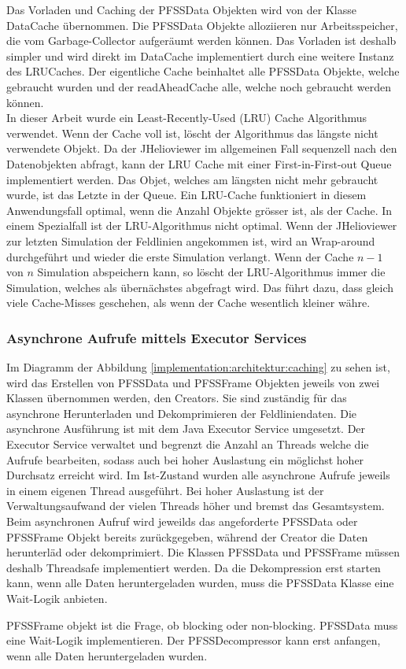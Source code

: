 Das Vorladen und Caching der PFSSData Objekten wird von der Klasse DataCache übernommen. Die PFSSData Objekte alloziieren nur Arbeitsspeicher, die vom Garbage-Collector aufgeräumt werden können. Das Vorladen ist deshalb simpler und wird direkt im DataCache implementiert durch eine weitere Instanz des LRUCaches. Der eigentliche Cache beinhaltet alle PFSSData Objekte, welche gebraucht wurden und der readAheadCache alle, welche noch gebraucht werden können.\\
[\baselineskip] 
In dieser Arbeit wurde ein Least-Recently-Used (LRU) Cache Algorithmus verwendet. Wenn der Cache voll ist, löscht der Algorithmus das längste nicht verwendete Objekt. Da der JHelioviewer im allgemeinen Fall sequenzell nach den Datenobjekten abfragt, kann der LRU Cache mit einer First-in-First-out Queue implementiert werden. Das Objet, welches am längsten nicht mehr gebraucht wurde, ist das Letzte in der Queue. Ein LRU-Cache funktioniert in diesem Anwendungsfall optimal, wenn die Anzahl Objekte grösser ist, als der Cache. In einem Spezialfall ist der LRU-Algorithmus nicht optimal. Wenn der JHelioviewer zur letzten Simulation der Feldlinien angekommen ist, wird an Wrap-around durchgeführt und wieder die erste Simulation verlangt. Wenn der Cache $n-1$ von $n$ Simulation abspeichern kann, so löscht der LRU-Algorithmus immer die Simulation, welches als übernächstes abgefragt wird. Das führt dazu, dass gleich viele Cache-Misses geschehen, als wenn der Cache wesentlich kleiner währe.

\subsubsection{Asynchrone Aufrufe mittels Executor Services}
Im Diagramm der Abbildung \ref{implementation:architektur:caching} zu sehen ist, wird das Erstellen von PFSSData und PFSSFrame Objekten jeweils von zwei Klassen übernommen werden, den Creators. Sie sind zuständig für das asynchrone Herunterladen und Dekomprimieren der Feldliniendaten. Die asynchrone Ausführung ist mit dem Java Executor Service umgesetzt. Der Executor Service verwaltet und begrenzt die Anzahl an Threads welche die Aufrufe bearbeiten, sodass auch bei hoher Auslastung ein möglichst hoher Durchsatz erreicht wird. Im Ist-Zustand wurden alle asynchrone Aufrufe jeweils in einem eigenen Thread ausgeführt. Bei hoher Auslastung ist der Verwaltungsaufwand der vielen Threads höher und bremst das Gesamtsystem.\\
Beim asynchronen Aufruf wird jeweilds das angeforderte PFSSData oder PFSSFrame Objekt bereits zurückgegeben, während der Creator die Daten herunterläd oder dekomprimiert. Die Klassen PFSSData und PFSSFrame müssen deshalb Threadsafe implementiert werden. Da die Dekompression erst starten kann, wenn alle Daten heruntergeladen wurden, muss die PFSSData Klasse eine Wait-Logik anbieten.

 PFSSFrame objekt ist die Frage, ob blocking oder non-blocking.
PFSSData muss eine Wait-Logik implementieren. Der PFSSDecompressor kann erst anfangen, wenn alle Daten heruntergeladen wurden.